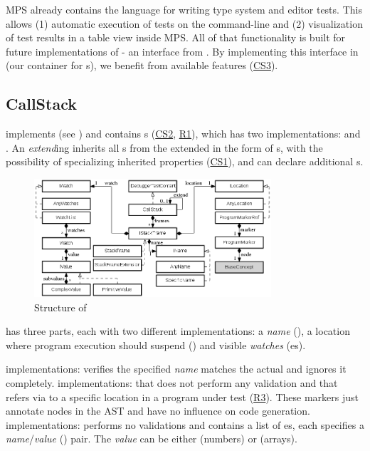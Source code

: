 \ac{MPS} already contains the language  for writing type
system and editor tests. This allows (1) automatic execution
of tests on the command-line and 
(2) visualization of test results in a table view inside \ac{MPS}.
All of that functionality is built for future implementations of 
- an interface from . By implementing this interface in
 (our container for s), we benefit from
available features (\hyperref[CS3]{CS3}).

\subsection{CallStack}

 implements  
(see ) and contains
s (\hyperref[CS2]{CS2}, \hyperref[R1]{R1}),
which has two implementations:
 and .
An \emph{extend}ing  inherits all s
from the extended  in the form of s, with
the possibility of specializing inherited properties (\hyperref[CS1]{CS1}), 
and can declare additional s.
\vspace{1mm}

\begin{figure}[h]
  \vspace{-3mm}
  \centering
    \includegraphics[width=8.8cm]{./figures/graph3-2.png} 
    \vspace{-2mm}
    \caption{Structure of }
  \label{fig:CallStackStructure}
\end{figure}

 has three parts, each with two different implementations: a
\emph{name} (), a location where program execution
should suspend () and visible \emph{watches}
(es). 


 implementations:  verifies
the specified \emph{name} matches the actual and  ignores it
completely.  implementations:
 that does not perform any validation and 
 that refers via  to a specific
location in a program under test (\hyperref[R3]{R3}). These markers just
annotate nodes in the \ac{AST} and have no influence on code generation.
 implementations:  performs no validations and
 contains a list of es,
each specifies a \emph{name}/\emph{value} () pair. The \emph{value}
can be either  (\eg numbers) or  (\eg arrays).

